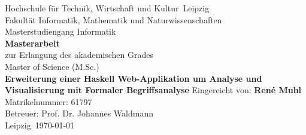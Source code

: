 \begin{titlepage}
\begin{large}
\begin{center}

Hochschule für Technik, Wirtschaft und Kultur\ Leipzig\\[8pt]
Fakultät Informatik, Mathematik und Naturwissenschaften\\[8pt]
Masterstudiengang Informatik\\[8pt]
\vskip 2cm
\textbf{Masterarbeit}\\[8pt]
zur Erlangung des akademischen Grades\\[8pt]

Master of Science (M.Sc.)\\[8pt]
\vskip 1cm
{\LARGE{\textbf{{Erweiterung einer Haskell Web-Applikation um Analyse und Visualisierung mit Formaler Begriffsanalyse}}}}
\vfill
Eingereicht von: \textbf{René Muhl}\\[8pt]
Matrikelnummer: 61797\\[8pt]
Betreuer: Prof. Dr. Johannes Waldmann\\[8pt]
\vfill
Leipzig\ \today\\
\end{center}
\end{large}
\end{titlepage}
